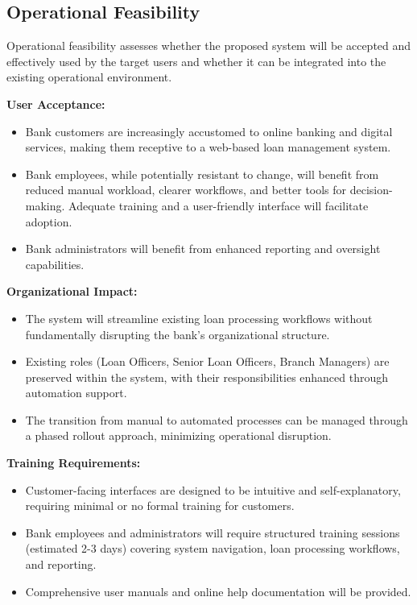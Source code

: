 \subsection{Operational Feasibility}

Operational feasibility assesses whether the proposed system will be accepted and effectively used by the target users and whether it can be integrated into the existing operational environment.

\textbf{User Acceptance:}

\begin{itemize}
  \item Bank customers are increasingly accustomed to online banking and digital services, making them receptive to a web-based loan management system.
  \item Bank employees, while potentially resistant to change, will benefit from reduced manual workload, clearer workflows, and better tools for decision-making. Adequate training and a user-friendly interface will facilitate adoption.
  \item Bank administrators will benefit from enhanced reporting and oversight capabilities.
\end{itemize}

\textbf{Organizational Impact:}

\begin{itemize}
  \item The system will streamline existing loan processing workflows without fundamentally disrupting the bank's organizational structure.
  \item Existing roles (Loan Officers, Senior Loan Officers, Branch Managers) are preserved within the system, with their responsibilities enhanced through automation support.
  \item The transition from manual to automated processes can be managed through a phased rollout approach, minimizing operational disruption.
\end{itemize}

\textbf{Training Requirements:}

\begin{itemize}
  \item Customer-facing interfaces are designed to be intuitive and self-explanatory, requiring minimal or no formal training for customers.
  \item Bank employees and administrators will require structured training sessions (estimated 2-3 days) covering system navigation, loan processing workflows, and reporting.
  \item Comprehensive user manuals and online help documentation will be provided.
\end{itemize}

